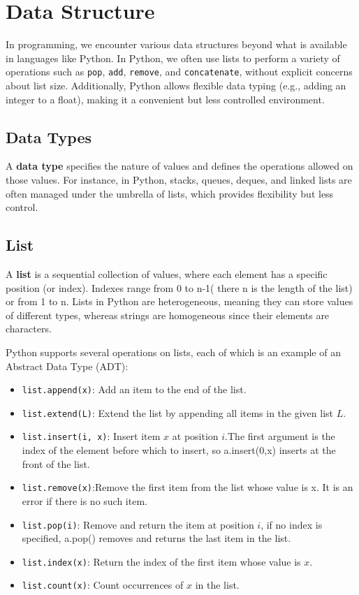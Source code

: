 \chapter{Data Structure}

    In programming, we encounter various data structures beyond what is available in languages like Python. In Python, we often use lists to perform a variety of operations such as \texttt{pop}, \texttt{add}, \texttt{remove}, and \texttt{concatenate}, without explicit concerns about list size. Additionally, Python allows flexible data typing (e.g., adding an integer to a float), making it a convenient but less controlled environment. 
    
    \section{Data Types}
    A \textbf{data type} specifies the nature of values and defines the operations allowed on those values. For instance, in Python, stacks, queues, deques, and linked lists are often managed under the umbrella of lists, which provides flexibility but less control.
    
    \section{List}
    A \textbf{list} is a sequential collection of values, where each element has a specific position (or index).
    Indexes range from 0 to n-1( there n is the length of the list) or from 1 to n. Lists in Python are heterogeneous, meaning they can store values of different types, whereas strings are homogeneous since their elements are characters.
    
    Python supports several operations on lists, each of which is an example of an Abstract Data Type (ADT):
    \begin{itemize}
        \item \texttt{list.append(x)}: Add an item to the end of the list.
        \item \texttt{list.extend(L)}: Extend the list by appending all items in the given list \(L\).
        \item \texttt{list.insert(i, x)}: Insert item \(x\) at position \(i\).The first argument is the index of the element before which to insert, so a.insert(0,x) inserts at the front of the list.
        \item \texttt{list.remove(x)}:Remove the first item from the list whose value is x. It is an error if there is no such item.
        \item \texttt{list.pop(i)}: Remove and return the item at position \(i\), if no index is specified, a.pop() removes and returns the last item in the list.
        \item \texttt{list.index(x)}: Return the index of the first item  whose value is \(x\).
        \item \texttt{list.count(x)}: Count occurrences of \(x\) in the list.
    \end{itemize}
    
